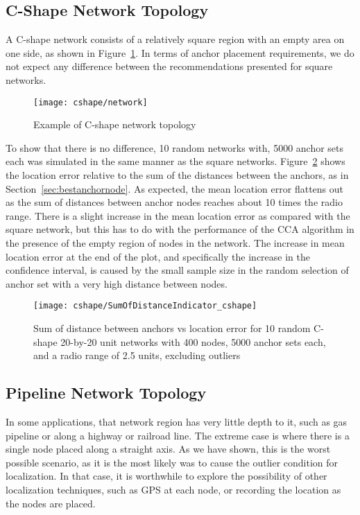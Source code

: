 \subsection{C-Shape Network Topology}

A C-shape network consists of a relatively square region with an empty area on one side, as shown in Figure~\ref{fig:cnetwork}.  In terms of anchor placement requirements, we do not expect any difference between the recommendations presented for square networks.

\begin{figure}
  \centering
	\texttt{[image: cshape/network]}
	\caption{Example of C-shape network topology}
	\label{fig:cnetwork}
\end{figure}

To show that there is no difference, 10 random networks with, 5000 anchor sets each was simulated in the same manner as the square networks.  Figure~\ref{fig:cindicator} shows the location error relative to the sum of the distances between the anchors, as in Section~\ref{sec:bestanchornode}. 
As expected, the mean location error flattens out as the sum of distances between anchor nodes reaches about 10 times the radio range.  There is a slight increase in the mean location error as compared with the square network, but this has to do with the performance of the CCA algorithm in the presence of the empty region of nodes in the network.  The increase in mean location error at the end of the plot, and specifically the increase in the confidence interval, is caused by the small sample size in the random selection of anchor set with a very high distance between nodes. 

\begin{figure}
  \centering
	\texttt{[image: cshape/SumOfDistanceIndicator\_cshape]}
	\caption[Sum of distance between anchors vs location error in a C-Shape topology]{Sum of distance between anchors vs location error for 10 random C-shape 20-by-20 unit networks with 400 nodes, 5000 anchor sets each, and a radio range of 2.5 units, excluding outliers}
	\label{fig:cindicator}
\end{figure}

\subsection{Pipeline Network Topology}

In some applications, that network region has very little depth to it, such as gas pipeline or along a highway or railroad line.  The extreme case is where there is a single node placed along a straight axis.  As we have shown, this is the worst possible scenario, as it is the most likely was to cause the outlier condition for localization.  In that case, it is worthwhile to explore the possibility of other localization techniques, such as GPS at each node, or recording the location as the nodes are placed.  

